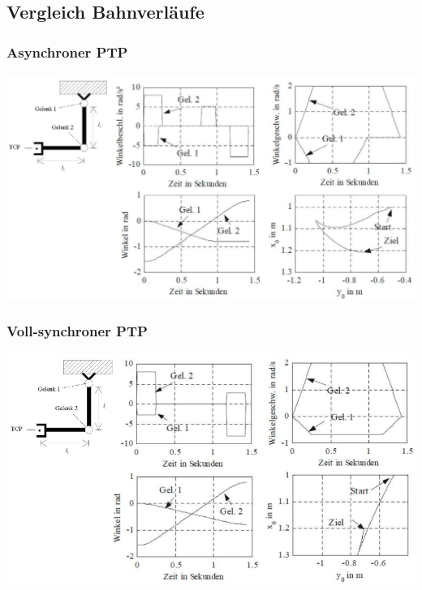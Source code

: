 \subsection{Vergleich Bahnverläufe}
\begin{multicols}{3}
    \begin{minipage}{\linewidth}
        \subsubsection{Asynchroner PTP}
        \includegraphics[width=\linewidth]{./bilder/VBAPTP}
    \end{minipage}

    \begin{minipage}{\linewidth}
        \subsubsection{Voll-synchroner PTP}
        \includegraphics[width=\linewidth]{./bilder/VBVPTP}
    \end{minipage}

    \begin{minipage}{\linewidth}

\end{minipage}
\end{multicols}
